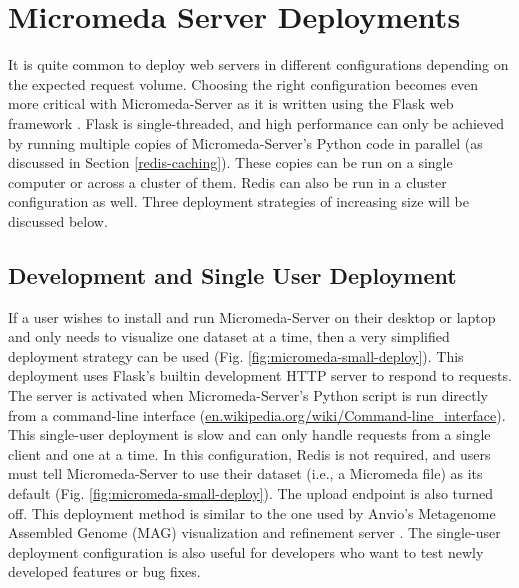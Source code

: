 \section{Micromeda Server Deployments} \label{micromeda-server-deployments}

It is quite common to deploy web servers in different configurations depending on the expected request volume. Choosing the right configuration becomes even more critical with Micromeda-Server as it is written using the Flask web framework \cite{grinberg2018flask}. Flask is single-threaded, and high performance can only be achieved by running multiple copies of Micromeda-Server's Python code in parallel (as discussed in Section \ref{redis-caching}). These copies can be run on a single computer or across a cluster of them. Redis can also be run in a cluster configuration as well. Three deployment strategies of increasing size will be discussed below. 

\subsection{Development and Single User Deployment}

If a user wishes to install and run Micromeda-Server on their desktop or laptop and only needs to visualize one dataset at a time, then a very simplified deployment strategy can be used (Fig. \ref{fig:micromeda-small-deploy}). This deployment uses Flask's builtin development HTTP server to respond to requests. The server is activated when Micromeda-Server's Python script is run directly from a command-line interface (\href{en.wikipedia.org/wiki/Command-line\_interface}{en.wikipedia.org/wiki/Command-line\_interface}). This single-user deployment is slow and can only handle requests from a single client and one at a time. In this configuration, Redis is not required, and users must tell Micromeda-Server to use their dataset (i.e., a Micromeda file) as its default (Fig. \ref{fig:micromeda-small-deploy}). The upload endpoint is also turned off. This deployment method is similar to the one used by Anvio's Metagenome Assembled Genome (MAG) visualization and refinement server \cite{eren2015anvi}. The single-user deployment configuration is also useful for developers who want to test newly developed features or bug fixes.

